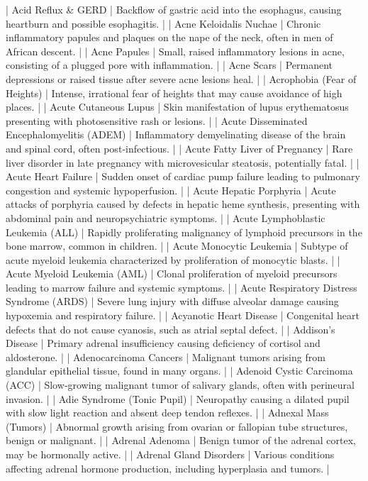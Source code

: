 | Acid Reflux & GERD | Backflow of gastric acid into the esophagus, causing heartburn and possible esophagitis. |
| Acne Keloidalis Nuchae | Chronic inflammatory papules and plaques on the nape of the neck, often in men of African descent. |
| Acne Papules | Small, raised inflammatory lesions in acne, consisting of a plugged pore with inflammation. |
| Acne Scars | Permanent depressions or raised tissue after severe acne lesions heal. |
| Acrophobia (Fear of Heights) | Intense, irrational fear of heights that may cause avoidance of high places. |
| Acute Cutaneous Lupus | Skin manifestation of lupus erythematosus presenting with photosensitive rash or lesions. |
| Acute Disseminated Encephalomyelitis (ADEM) | Inflammatory demyelinating disease of the brain and spinal cord, often post‑infectious. |
| Acute Fatty Liver of Pregnancy | Rare liver disorder in late pregnancy with microvesicular steatosis, potentially fatal. |
| Acute Heart Failure | Sudden onset of cardiac pump failure leading to pulmonary congestion and systemic hypoperfusion. |
| Acute Hepatic Porphyria | Acute attacks of porphyria caused by defects in hepatic heme synthesis, presenting with abdominal pain and neuropsychiatric symptoms. |
| Acute Lymphoblastic Leukemia (ALL) | Rapidly proliferating malignancy of lymphoid precursors in the bone marrow, common in children. |
| Acute Monocytic Leukemia | Subtype of acute myeloid leukemia characterized by proliferation of monocytic blasts. |
| Acute Myeloid Leukemia (AML) | Clonal proliferation of myeloid precursors leading to marrow failure and systemic symptoms. |
| Acute Respiratory Distress Syndrome (ARDS) | Severe lung injury with diffuse alveolar damage causing hypoxemia and respiratory failure. |
| Acyanotic Heart Disease | Congenital heart defects that do not cause cyanosis, such as atrial septal defect. |
| Addison’s Disease | Primary adrenal insufficiency causing deficiency of cortisol and aldosterone. |
| Adenocarcinoma Cancers | Malignant tumors arising from glandular epithelial tissue, found in many organs. |
| Adenoid Cystic Carcinoma (ACC) | Slow‑growing malignant tumor of salivary glands, often with perineural invasion. |
| Adie Syndrome (Tonic Pupil) | Neuropathy causing a dilated pupil with slow light reaction and absent deep tendon reflexes. |
| Adnexal Mass (Tumors) | Abnormal growth arising from ovarian or fallopian tube structures, benign or malignant. |
| Adrenal Adenoma | Benign tumor of the adrenal cortex, may be hormonally active. |
| Adrenal Gland Disorders | Various conditions affecting adrenal hormone production, including hyperplasia and tumors. |
